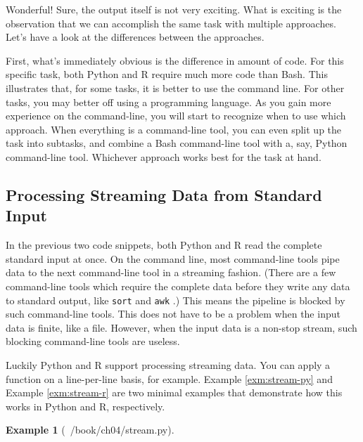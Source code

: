 \documentclass[
]{book}
\newenvironment{Shaded}{\begin{snugshade}}{\end{snugshade}}
\newcommand{\BuiltInTok}[1]{#1}
\newcommand{\CharTok}[1]{\textcolor[rgb]{0.31,0.60,0.02}{#1}}
\newcommand{\CommentTok}[1]{\textcolor[rgb]{0.56,0.35,0.01}{\textit{#1}}}
\newcommand{\ControlFlowTok}[1]{\textcolor[rgb]{0.13,0.29,0.53}{\textbf{#1}}}
\newcommand{\DecValTok}[1]{\textcolor[rgb]{0.00,0.00,0.81}{#1}}
\newcommand{\ImportTok}[1]{#1}
\newcommand{\KeywordTok}[1]{\textcolor[rgb]{0.13,0.29,0.53}{\textbf{#1}}}
\newcommand{\NormalTok}[1]{#1}
\newcommand{\OperatorTok}[1]{\textcolor[rgb]{0.81,0.36,0.00}{\textbf{#1}}}
\newcommand{\SpecialCharTok}[1]{\textcolor[rgb]{0.00,0.00,0.00}{#1}}
\newcommand{\StringTok}[1]{\textcolor[rgb]{0.31,0.60,0.02}{#1}}
\newcommand{\VariableTok}[1]{\textcolor[rgb]{0.00,0.00,0.00}{#1}}
\theoremstyle{definition}
\theoremstyle{definition}
\newtheorem{example}{Example}[chapter]
\theoremstyle{definition}
\theoremstyle{remark}
\begin{document}
Wonderful! Sure, the output itself is not very exciting. What is exciting is the observation that we can accomplish the same task with multiple approaches. Let's have a look at the differences between the approaches.

First, what's immediately obvious is the difference in amount of code. For this specific task, both Python and R require much more code than Bash. This illustrates that, for some tasks, it is better to use the command line. For other tasks, you may better off using a programming language. As you gain more experience on the command-line, you will start to recognize when to use which approach. When everything is a command-line tool, you can even split up the task into subtasks, and combine a Bash command-line tool with a, say, Python command-line tool. Whichever approach works best for the task at hand.

\hypertarget{processing-streaming-data-from-standard-input}{%
\subsection{Processing Streaming Data from Standard Input}\label{processing-streaming-data-from-standard-input}}

In the previous two code snippets, both Python and R read the complete standard input at once. On the command line, most command-line tools pipe data to the next command-line tool in a streaming fashion. (There are a few command-line tools which require the complete data before they write any data to standard output, like \texttt{sort} and \texttt{awk} \citep{awk}.) This means the pipeline is blocked by such command-line tools. This does not have to be a problem when the input data is finite, like a file. However, when the input data is a non-stop stream, such blocking command-line tools are useless.

Luckily Python and R support processing streaming data. You can apply a function on a line-per-line basis, for example. Example \ref{exm:stream-py} and Example \ref{exm:stream-r} are two minimal examples that demonstrate how this works in Python and R, respectively.

\begin{example}[~/book/ch04/stream.py]
\protect\hypertarget{exm:stream-py}{}{\label{exm:stream-py} {} }
\end{example}

\begin{Shaded}
\end{Shaded}
\end{document}
